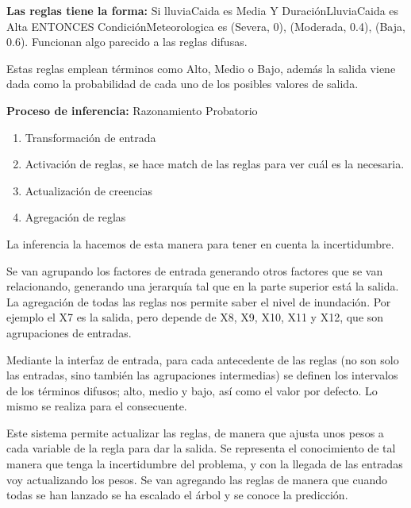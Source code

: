 \documentclass[12pt, twoside, openright]{report} %
\begin{document}
\textbf{Las reglas tiene la forma:} Si lluviaCaida es Media Y DuraciónLluviaCaida es Alta ENTONCES CondiciónMeteorologica es {(Severa, 0), (Moderada, 0.4), (Baja, 0.6)}. Funcionan algo parecido a las reglas difusas.

Estas reglas emplean términos como Alto, Medio o Bajo, además la salida viene dada como la probabilidad de cada uno de los posibles valores de salida.

\textbf{Proceso de inferencia:} Razonamiento Probatorio
\begin{enumerate}
	\item Transformación de entrada
	\item Activación de reglas, se hace match de las reglas para ver cuál es la necesaria.
	\item Actualización de creencias
	\item Agregación de reglas
\end{enumerate}
La inferencia la hacemos de esta manera para tener en cuenta la incertidumbre.

Se van agrupando los factores de entrada generando otros factores que se van relacionando, generando una jerarquía tal que en la parte superior está la salida. La agregación de todas las reglas nos permite saber el nivel de inundación. Por ejemplo el X7 es la salida, pero depende de X8, X9, X10, X11 y X12, que son agrupaciones de entradas.

Mediante la interfaz de entrada, para cada antecedente de las reglas (no son solo las entradas, sino también las agrupaciones intermedias) se definen los intervalos de los términos difusos; alto, medio y bajo, así como el valor por defecto. Lo mismo se realiza para el consecuente.

Este sistema permite actualizar las reglas, de manera que ajusta unos pesos a cada variable de la regla para dar la salida. Se representa el conocimiento de tal manera que tenga la incertidumbre del problema, y con la llegada de las entradas voy actualizando los pesos. Se van agregando las reglas de manera que cuando todas se han lanzado se ha escalado el árbol y se conoce la predicción.
\end{document}
